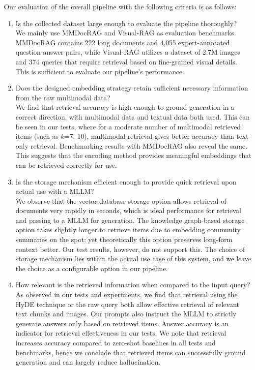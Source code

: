 Our evaluation of the overall pipeline with the following criteria is as follows:
\begin{enumerate}
    \item Is the collected dataset large enough to evaluate the pipeline thoroughly? \\
            We mainly use MMDocRAG and Visual-RAG as evaluation benchmarks. 
            MMDocRAG contains 222 long documents and 4,055 expert-annotated question-answer pairs, 
            while Visual-RAG utilizes a dataset of 2.7M images and 374 queries that require retrieval based on fine-grained visual details.
            This is sufficient to evaluate our pipeline's performance.

    \item Does the designed embedding strategy retain sufficient necessary information from the raw multimodal data? \\
            We find that retrieval accuracy is high enough to ground generation in a correct direction, 
            with multimodal data and textual data both used.
            This can be seen in our tests, where for a moderate number of multimodal retrieved items (such as $k$=7, 10),
            multimodal retrieval gives better accuracy than text-only retrieval.
            Benchmarking results with MMDocRAG also reveal the same.
            This suggests that the encoding method provides meaningful embeddings that can be retrieved correctly for use.

    \item Is the storage mechanism efficient enough to provide quick retrieval upon actual use with a MLLM? \\
            We observe that the vector database storage option allows retrieval of documents very rapidly in seconds, 
            which is ideal performance for retrieval and passing to a MLLM for generation.
            The knowledge graph-based storage option takes slightly longer to retrieve items due to embedding community summaries on the spot;
            yet theoretically this option preserves long-form context better.
            Our test results, however, do not support this.
            The choice of storage mechanism lies within the actual use case of this system,
            and we leave the choice as a configurable option in our pipeline.

    \item How relevant is the retrieved information when compared to the input query? \\
            As observed in our tests and experiments, we find that retrieval using the HyDE technique or the raw query both allow
            effective retrieval of relevant text chunks and images.
            Our prompts also instruct the MLLM to strictly generate answers only based on retrieved items.
            Answer accuracy is an indicator for retrieval effectiveness in our tests.
            We note that retrieval increases accuracy compared to zero-shot baselines in all tests and benchmarks,
            hence we conclude that retrieved items can successfully ground generation and can largely reduce hallucination.


\end{enumerate}
